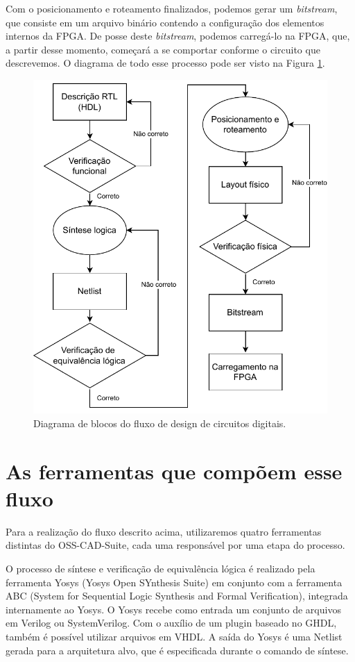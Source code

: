\documentclass{report}
\begin{document}
Com o posicionamento e roteamento finalizados, podemos gerar um \textit{bitstream}, que consiste em um arquivo binário contendo a configuração dos elementos internos da FPGA. De posse deste \textit{bitstream}, podemos carregá-lo na FPGA, que, a partir desse momento, começará a se comportar conforme o circuito que descrevemos. O diagrama de todo esse processo pode ser visto na Figura \ref{fig:diagrama-fluxo-hardware}.

\begin{figure}[H]
    \centering
    \includegraphics[width=0.9\linewidth]{hardware_levels.drawio.pdf}
    \caption{Diagrama de blocos do fluxo de design de circuitos digitais.}
    \label{fig:diagrama-fluxo-hardware}
\end{figure}

\section{As ferramentas que compõem esse fluxo}

Para a realização do fluxo descrito acima, utilizaremos quatro ferramentas distintas do OSS-CAD-Suite, cada uma responsável por uma etapa do processo.

O processo de síntese e verificação de equivalência lógica é realizado pela ferramenta Yosys (Yosys Open SYnthesis Suite) em conjunto com a ferramenta ABC (System for Sequential Logic Synthesis and Formal Verification), integrada internamente ao Yosys. O Yosys recebe como entrada um conjunto de arquivos em Verilog ou SystemVerilog. Com o auxílio de um plugin baseado no GHDL, também é possível utilizar arquivos em VHDL. A saída do Yosys é uma Netlist gerada para a arquitetura alvo, que é especificada durante o comando de síntese.
\end{document}
